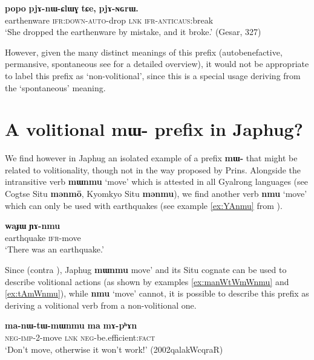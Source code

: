 \documentclass[oneside,a4paper,11pt]{article}
\newcommand{\ipa}[1]{\textbf{{\phon\mbox{#1}}}} %
\begin{document}
\begin{exe}
\ex \label{ex:pjAnWClWG}
\gll \ipa{popo} 	\ipa{pjɤ-nɯ-ɕlɯɣ} 	\ipa{tɕe,} 	\ipa{pjɤ-ɴɢrɯ.}  \\
earthenware \textsc{ifr:down-auto}-drop \textsc{lnk} \textsc{ifr-anticaus}:break \\
\glt `She dropped the earthenware by mistake, and it broke.' (Gesar, 327)
\end{exe}

 However, given the many distinct meanings of this prefix (autobenefactive,  permansive, spontaneous see \citet{jacques15spontaneous} for a detailed overview), it would not be appropriate to label this prefix as `non-volitional', since this is a special usage deriving from the `spontaneous' meaning.

\section{A volitional \ipa{mɯ-} prefix in Japhug?}
We find however in Japhug an isolated example of a prefix \ipa{mɯ-} that might be related to volitionality, though not in the way proposed by Prins. Alongside the intransitive verb \ipa{mɯnmu} `move' which is attested in all Gyalrong languages (see Cogtse Situ \ipa{mənmō}, Kyomkyo Situ \ipa{mənmu}), we find another verb \ipa{nmu} `move' which can only be used with earthquakes (see example \ref{ex:YAnmu} from \citealt{jacques16japhug}).

\begin{exe}
\ex \label{ex:YAnmu}
\gll
\ipa{waɟɯ} \ipa{ɲɤ-nmu} \\
earthquake \textsc{ifr}-move \\
\glt `There was an earthquake.'
\end{exe}

Since (contra \citealt[505]{prins16kyomkyo}), Japhug \ipa{mɯnmu}  move' and its Situ cognate can be used to describe volitional actions (as shown by examples  \ref{ex:manWtWmWnmu} and \ref{ex:tAmWnmu}), while \ipa{nmu} `move' cannot, it is possible to describe this prefix as deriving a volitional verb from a non-volitional one. 

\begin{exe}
\ex \label{ex:manWtWmWnmu}
\gll  \ipa{ma-nɯ-tɯ-mɯnmu} \ipa{ma} \ipa{mɤ-pʰɤn} \\
\textsc{neg-imp}-2-move \textsc{lnk} \textsc{neg}-be.efficient:\textsc{fact} \\
\glt `Don't move, otherwise it won't work!' (2002qalakWcqraR)
\end{exe}
\end{document}
